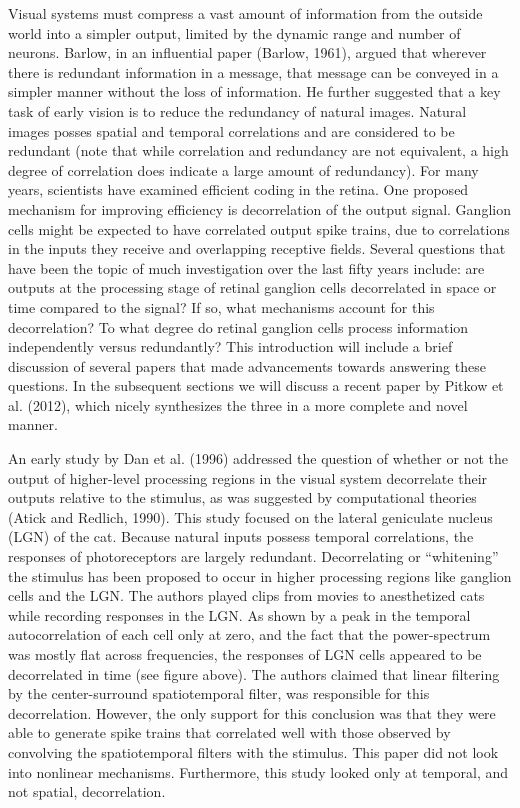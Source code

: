 \documentclass[12pt]{article}
\begin{document}
Visual systems must compress a vast amount of information from the outside world into a simpler output, limited by the dynamic range and number of neurons. Barlow, in an influential paper (Barlow, 1961), argued that wherever there is redundant information in a message, that message can be conveyed in a simpler manner without the loss of information. He further suggested that a key task of early vision is to reduce the redundancy of natural images. Natural images posses spatial and temporal correlations and are considered to be redundant (note that while correlation and redundancy are not equivalent, a high degree of correlation does indicate a large amount of redundancy). For many years, scientists have examined efficient coding in the retina. One proposed mechanism for improving efficiency is decorrelation of the output signal. Ganglion cells might be expected to have correlated output spike trains, due to correlations in the inputs they receive and overlapping receptive fields. Several questions that have been the topic of much investigation over the last fifty years include: are outputs at the processing stage of retinal ganglion cells decorrelated in space or time compared to the signal? If so, what mechanisms account for this decorrelation? To what degree do retinal ganglion cells process information independently versus redundantly? This introduction will include a brief discussion of several papers that made advancements towards answering these questions. In the subsequent sections we will discuss a recent paper by Pitkow et al. (2012), which nicely synthesizes the three in a more complete and novel manner.

An early study by Dan et al. (1996) addressed the question of whether or not the output of higher-level processing regions in the visual system decorrelate their outputs relative to the stimulus, as was suggested by computational theories (Atick and Redlich, 1990). This study focused on the lateral geniculate nucleus (LGN) of the cat. Because natural inputs possess temporal correlations, the responses of photoreceptors are largely redundant. Decorrelating or “whitening” the stimulus has been proposed to occur in higher processing regions like ganglion cells and the LGN. The authors played clips from movies to anesthetized cats while recording responses in the LGN. As shown by a peak in the temporal autocorrelation of each cell only at zero, and the fact that the power-spectrum was mostly flat across frequencies, the responses of LGN cells appeared to be decorrelated in time (see figure above). The authors claimed that linear filtering by the center-surround spatiotemporal filter, was responsible for this decorrelation. However, the only support for this conclusion was that they were able to generate spike trains that correlated well with those observed by convolving the spatiotemporal filters with the stimulus. This paper did not look into nonlinear mechanisms. Furthermore, this study looked only at temporal, and not spatial, decorrelation.
\end{document}
